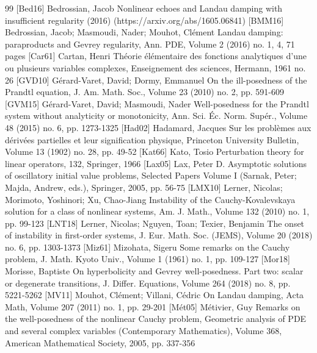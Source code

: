 \documentclass[10pt]{amsart}
\theoremstyle{definition}
\theoremstyle{plain}
\begin{document}
\begin{thebibliography}{99}
 [Bed16] Bedrossian, Jacob Nonlinear echoes and Landau damping with insufficient regularity (2016) (https://arxiv.org/abs/1605.06841)
 [BMM16] Bedrossian, Jacob; Masmoudi, Nader; Mouhot, Clément Landau damping: paraproducts and Gevrey regularity, Ann. PDE, Volume 2 (2016) no. 1, 4, 71 pages
 [Car61] Cartan, Henri Théorie élémentaire des fonctions analytiques d’une ou plusieurs variables complexes, Enseignement des sciences, Hermann, 1961 no. 26
 [GVD10] Gérard-Varet, David; Dormy, Emmanuel On the ill-posedness of the Prandtl equation, J. Am. Math. Soc., Volume 23 (2010) no. 2, pp. 591-609
 [GVM15] Gérard-Varet, David; Masmoudi, Nader Well-posedness for the Prandtl system without analyticity or monotonicity, Ann. Sci. Éc. Norm. Supér., Volume 48 (2015) no. 6, pp. 1273-1325
 [Had02] Hadamard, Jacques Sur les problèmes aux dérivées partielles et leur signification physique, Princeton University Bulletin, Volume 13 (1902) no. 28, pp. 49-52
 [Kat66] Kato, Tosio Perturbation theory for linear operators, 132, Springer, 1966
 [Lax05] Lax, Peter D. Asymptotic solutions of oscillatory initial value problems, Selected Papers Volume I (Sarnak, Peter; Majda, Andrew, eds.), Springer, 2005, pp. 56-75
 [LMX10] Lerner, Nicolas; Morimoto, Yoshinori; Xu, Chao-Jiang Instability of the Cauchy-Kovalevskaya solution for a class of nonlinear systems, Am. J. Math., Volume 132 (2010) no. 1, pp. 99-123
 [LNT18] Lerner, Nicolas; Nguyen, Toan; Texier, Benjamin The onset of instability in first-order systems, J. Eur. Math. Soc. (JEMS), Volume 20 (2018) no. 6, pp. 1303-1373
 [Miz61] Mizohata, Sigeru Some remarks on the Cauchy problem, J. Math. Kyoto Univ., Volume 1 (1961) no. 1, pp. 109-127
 [Mor18] Morisse, Baptiste On hyperbolicity and Gevrey well-posedness. Part two: scalar or degenerate transitions, J. Differ. Equations, Volume 264 (2018) no. 8, pp. 5221-5262
 [MV11] Mouhot, Clément; Villani, Cédric On Landau damping, Acta Math, Volume 207 (2011) no. 1, pp. 29-201
 [Mét05] Métivier, Guy Remarks on the well-posedness of the nonlinear Cauchy problem, Geometric analysis of PDE and several complex variables (Contemporary Mathematics), Volume 368, American Mathematical Society, 2005, pp. 337-356

\end{thebibliography}
\end{document}
